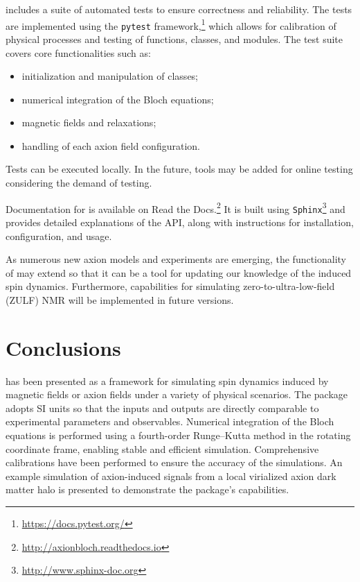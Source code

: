 \documentclass[universe,article,submit,oneauthor]{Definitions/mdpi}
\begin{document}
\axionbloch{} includes a suite of automated tests to ensure correctness and reliability. 
The tests are implemented using the \texttt{pytest} framework,\footnote{\url{https://docs.pytest.org/}} which allows for calibration of physical processes and testing of functions, classes, and modules. 
The test suite covers core functionalities such as:
\begin{itemize}
    \item initialization and manipulation of classes; 
    \item numerical integration of the Bloch equations;
    \item magnetic fields and relaxations;
    \item handling of each axion field configuration.
\end{itemize}
Tests can be executed locally. In the future, tools may be added for online testing considering the demand of testing. 

Documentation for \axionbloch{} is available on Read the Docs.\footnote{\url{http://axionbloch.readthedocs.io}}
It is built using \texttt{Sphinx}\footnote{\url{http://www.sphinx-doc.org}} and provides detailed explanations of the API, along with instructions for installation, configuration, and usage.

As numerous new axion models and experiments are emerging, the functionality of \axionbloch{} may extend so that it can be a tool for updating our knowledge of the induced spin dynamics. 
Furthermore, capabilities for simulating zero-to-ultra-low-field (ZULF) NMR will be implemented in future versions. 


\section{Conclusions}
\label{sec:conclusions}


\axionbloch{} has been presented as a framework for simulating spin dynamics induced by magnetic fields or axion fields under a variety of physical scenarios. 
The package adopts SI units so that the inputs and outputs are directly comparable to experimental parameters and observables. 
Numerical integration of the Bloch equations is performed using a fourth-order Runge--Kutta method in the rotating coordinate frame, enabling stable and efficient simulation. 
Comprehensive calibrations have been performed to ensure the accuracy of the simulations.
An example simulation of axion-induced signals from a local virialized axion dark matter halo is presented to demonstrate the package's capabilities. 
\end{document}
